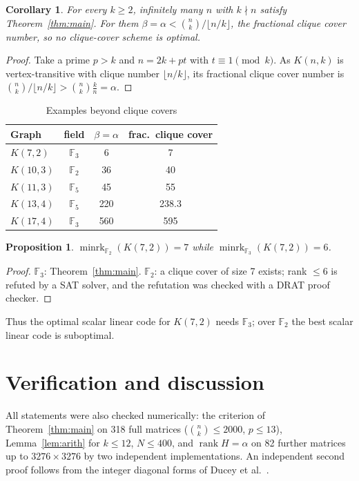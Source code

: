 \documentclass[conference]{IEEEtran}
\newtheorem{proposition}{Proposition}
\newtheorem{corollary}{Corollary}
\theoremstyle{remark}
\newcommand{\F}{\mathbb{F}}
\newcommand{\minrk}{\operatorname{minrk}}
\newcommand{\rank}{\operatorname{rank}}
\begin{document}
\begin{corollary}\label{cor:new}
For every $k\ge2$, infinitely many $n$ with $k\nmid n$ satisfy Theorem~\ref{thm:main}. For them
$\beta=\alpha<\binom nk/\lfloor n/k\rfloor$, the fractional clique cover number, so no clique-cover scheme is optimal.
\end{corollary}
\begin{proof}
Take a prime $p>k$ and $n=2k+pt$ with $t\equiv1\pmod k$. As $K(n,k)$ is vertex-transitive with clique number
$\lfloor n/k\rfloor$, its fractional clique cover number is $\binom nk/\lfloor n/k\rfloor>\binom nk\frac kn=\alpha$.
\end{proof}

\begin{table}[t]\centering\caption{Examples beyond clique covers}\label{tab:ex}
\begin{tabular}{lccc}\toprule
Graph & field & $\beta=\alpha$ & frac.\ clique cover\\\midrule
$K(7,2)$ & $\F_3$ & 6 & 7\\
$K(10,3)$ & $\F_2$ & 36 & 40\\
$K(11,3)$ & $\F_5$ & 45 & 55\\
$K(13,4)$ & $\F_5$ & 220 & 238.3\\
$K(17,4)$ & $\F_3$ & 560 & 595\\\bottomrule
\end{tabular}\end{table}

\begin{proposition}\label{prop:sep}
$\minrk_{\F_2}(K(7,2))=7$ while $\minrk_{\F_3}(K(7,2))=6$.
\end{proposition}
\begin{proof}
$\F_3$: Theorem~\ref{thm:main}. $\F_2$: a clique cover of size 7 exists; rank $\le6$ is refuted by a SAT solver, and the
refutation was checked with a DRAT proof checker.
\end{proof}
Thus the optimal scalar linear code for $K(7,2)$ needs $\F_3$; over $\F_2$ the best scalar linear code is suboptimal.

\section{Verification and discussion}
All statements were also checked numerically: the criterion of Theorem~\ref{thm:main} on 318 full matrices
($\binom nk\le2000$, $p\le13$), Lemma~\ref{lem:arith} for $k\le12$, $N\le400$, and $\rank H=\alpha$ on 82 further matrices
up to $3276\times3276$ by two independent implementations. An independent second proof follows from the integer
diagonal forms of Ducey et al.~\cite{Ducey}.
\end{document}
